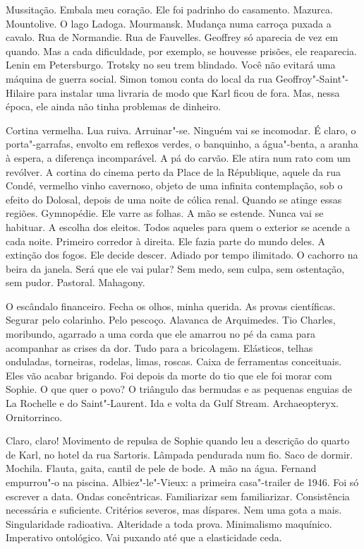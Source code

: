 Mussitação. Embala meu coração. Ele foi padrinho do casamento. Mazurca.
Mountolive. O lago Ladoga. Mourmansk. Mudança numa carroça puxada a
cavalo. Rua de Normandie. Rua de Fauvelles. Geoffrey só aparecia de vez
em quando. Mas a cada dificuldade, por exemplo, se houvesse prisões, ele
reaparecia. Lenin em Petersburgo. Trotsky no seu trem blindado. Você não
evitará uma máquina de guerra social. Simon tomou conta do local da rua
Geoffroy"-Saint"-Hilaire para instalar uma livraria de modo que Karl ficou
de fora. Mas, nessa época, ele ainda não tinha problemas de dinheiro.

Cortina vermelha. Lua ruiva. Arruinar"-se. Ninguém vai se incomodar. É
claro, o porta"-garrafas, envolto em reflexos verdes, o banquinho, a
água"-benta, a aranha à espera, a diferença incomparável. A pá do carvão.
Ele atira num rato com um revólver. A cortina do cinema perto da Place
de la République, aquele da rua Condé, vermelho vinho cavernoso, objeto
de uma infinita contemplação, sob o efeito do Dolosal, depois de uma
noite de cólica renal. Quando se atinge essas regiões. Gymnopédie. Ele
varre as folhas. A mão se estende. Nunca vai se habituar. A escolha dos
eleitos. Todos aqueles para quem o exterior se acende a cada noite.
Primeiro corredor à direita. Ele fazia parte do mundo deles. A extinção
dos fogos. Ele decide descer. Adiado por tempo ilimitado. O cachorro na
beira da janela. Será que ele vai pular? Sem medo, sem culpa, sem
ostentação, sem pudor. Pastoral. Mahagony.

O escândalo financeiro. Fecha os olhos, minha querida. As provas
científicas. Segurar pelo colarinho. Pelo pescoço. Alavanca de
Arquimedes. Tio Charles, moribundo, agarrado a uma corda que ele amarrou
no pé da cama para acompanhar as crises da dor. Tudo para a bricolagem.
Elásticos, telhas onduladas, torneiras, rodelas, limas, roscas. Caixa de
ferramentas conceituais. Eles vão acabar brigando. Foi depois da morte
do tio que ele foi morar com Sophie. O que quer o povo? O triângulo das
bermudas e as pequenas enguias de La Rochelle e do Saint"-Laurent. Ida e
volta da Gulf Stream. Archaeopteryx. Ornitorrinco.

Claro, claro! Movimento de repulsa de Sophie quando leu a descrição do
quarto de Karl, no hotel da rua Sartoris. Lâmpada pendurada num fio.
Saco de dormir. Mochila. Flauta, gaita, cantil de pele de bode. A mão na
água. Fernand empurrou"-o na piscina. Albiez"-le"-Vieux: a primeira
casa"-trailer de 1946. Foi só escrever a data. Ondas concêntricas.
Familiarizar sem familiarizar. Consistência necessária e suficiente.
Critérios severos, mas díspares. Nem uma gota a mais. Singularidade
radioativa. Alteridade a toda prova. Minimalismo maquínico. Imperativo
ontológico. Vai puxando até que a elasticidade ceda.

